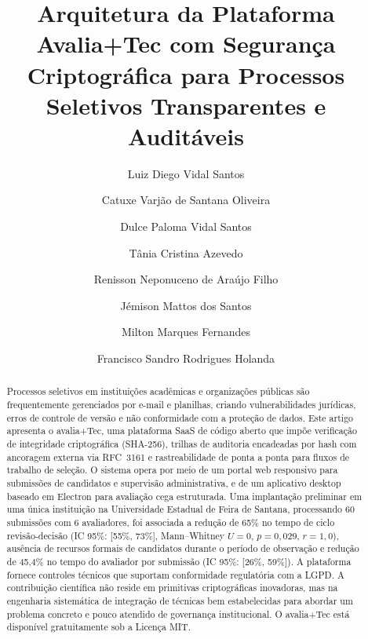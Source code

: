 \documentclass[preprint,12pt,a4paper]{elsarticle}
\begin{document}
\renewcommand{\labelenumii}{\arabic{enumi}.\arabic{enumii}}

\begin{frontmatter}

\title{Arquitetura da Plataforma Avalia+Tec com Segurança Criptográfica para Processos Seletivos Transparentes e Auditáveis}

\author[label1]{Luiz Diego Vidal Santos}
\author[label2]{Catuxe Varjão de Santana Oliveira}
\author[label4]{Dulce Paloma Vidal Santos}
\author[label1]{Tânia Cristina Azevedo}
\author[label3]{Renisson Neponuceno de Araújo Filho}
\author[label5]{Jémison Mattos dos Santos}
\author[label6]{Milton Marques Fernandes}
\author[label7]{Francisco Sandro Rodrigues Holanda}

\address[label1]{Universidade Estadual de Feira de Santana, Departamento de Ciências Exatas, Feira de Santana, Brasil}
\address[label2]{Universidade Federal de Sergipe, Programa de Pós-Graduação em Ciência da Propriedade Intelectual, São Cristóvão, Brasil}
\address[label3]{Universidade Federal Rural de Pernambuco, Departamento de Engenharia Rural, Recife, Brasil}
\address[label4]{Universidade Tiradentes, Departamento de Direito, Aracaju, Brasil}
\address[label5]{Universidade Estadual de Santa Cruz, Ilhéus, Brasil}
\address[label6]{Universidade Federal de Sergipe, Departamento de Ciências Florestais, São Cristóvão, Brasil}
\address[label7]{Universidade Federal de Sergipe, Departamento de Engenharia Agronômica, São Cristóvão, Brasil}


\begin{abstract}
Processos seletivos em instituições acadêmicas e organizações públicas são frequentemente gerenciados por e-mail e planilhas, criando vulnerabilidades jurídicas, erros de controle de versão e não conformidade com a proteção de dados. Este artigo apresenta o avalia+Tec, uma plataforma SaaS de código aberto que impõe verificação de integridade criptográfica (SHA-256), trilhas de auditoria encadeadas por hash com ancoragem externa via RFC~3161 e rastreabilidade de ponta a ponta para fluxos de trabalho de seleção. O sistema opera por meio de um portal web responsivo para submissões de candidatos e supervisão administrativa, e de um aplicativo desktop baseado em Electron para avaliação cega estruturada. Uma implantação preliminar em uma única instituição na Universidade Estadual de Feira de Santana, processando 60 submissões com 6 avaliadores, foi associada a redução de 65\% no tempo de ciclo revisão-decisão (IC 95\%: [55\%, 73\%], Mann--Whitney $U = 0$, $p = 0{,}029$, $r = 1{,}0$), ausência de recursos formais de candidatos durante o período de observação e redução de 45,4\% no tempo do avaliador por submissão (IC 95\%: [26\%, 59\%]). A plataforma fornece controles técnicos que suportam conformidade regulatória com a LGPD. A contribuição científica não reside em primitivas criptográficas inovadoras, mas na engenharia sistemática de integração de técnicas bem estabelecidas para abordar um problema concreto e pouco atendido de governança institucional. O avalia+Tec está disponível gratuitamente sob a Licença MIT.
\end{abstract}


\end{frontmatter}
\end{document}
